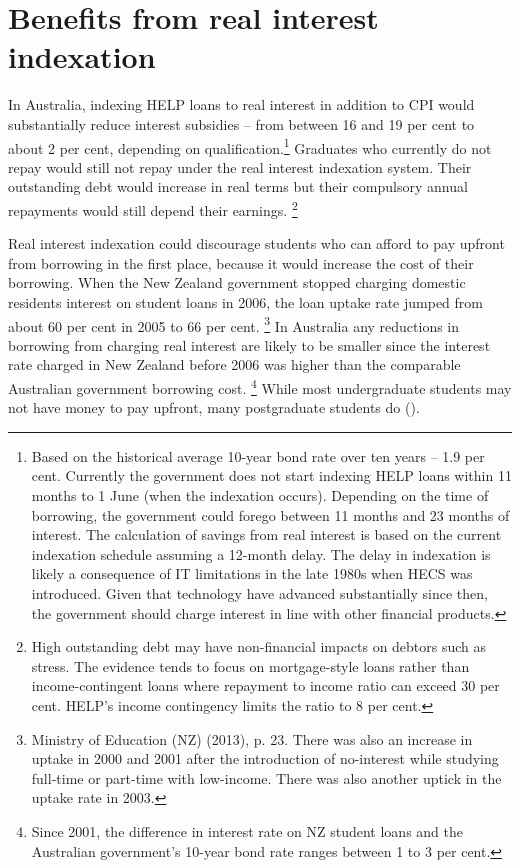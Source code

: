 \documentclass[embargoed]{grattan}
\begin{document}
{\section{Benefits from real interest indexation}\label{benefits-from-real-interest-indexation}

In Australia, indexing \gls{HELP} loans to real interest in addition to \gls{CPI} would substantially reduce interest subsidies -- from between 16 and 19 per cent to about 2 per cent, depending on qualification.\protect\hypertarget{_Ref335647424}{}{}\footnote{Based on the historical average 10-year bond rate over ten years -- 1.9 per cent.
Currently the government does not start indexing \gls{HELP} loans within 11 months to 1 June (when the indexation occurs).
Depending on the time of borrowing, the government could forego between 11 months and 23 months of interest.
The calculation of savings from real interest is based on the current indexation schedule assuming a 12-month delay.
The delay in indexation is likely a consequence of IT limitations in the late 1980s when \gls{HECS} was introduced.
Given that technology have advanced substantially since then, the government should charge interest in line with other financial products.} Graduates who currently do not repay would still not repay under the real interest indexation system.
Their outstanding debt would increase in real terms but their compulsory annual repayments would still depend their earnings.%
\footnote{High outstanding debt may have non-financial impacts on debtors such as stress.
The evidence tends to focus on mortgage-style loans rather than income-contingent loans where repayment to income ratio can exceed 30 per cent.
\gls{HELP}'s income contingency limits the ratio to 8 per cent.\label{fn:68-High-outstanding-debt-non-fin-impact}}

Real interest indexation could discourage students who can afford to pay upfront from borrowing in the first place, because it would increase the cost of their borrowing.
When the New Zealand government stopped charging domestic residents interest on student loans in 2006, the loan uptake rate jumped from about 60 per cent in 2005 to 66 per cent.%
\footnote{Ministry of Education (NZ) (2013), p. 23.
There was also an increase in uptake in 2000 and 2001 after the introduction of no-interest while studying full-time or part-time with low-income.
There was also another uptick in the uptake rate in 2003.} In Australia any reductions in borrowing from charging real interest are likely to be smaller since the interest rate charged in New Zealand before 2006 was higher than the comparable Australian government borrowing cost.%
\footnote{Since 2001, the difference in interest rate on NZ student loans and the Australian government's 10-year bond rate ranges between 1 to 3 per cent.} While most undergraduate students may not have money to pay upfront, many postgraduate students do ().

}
\end{document}
